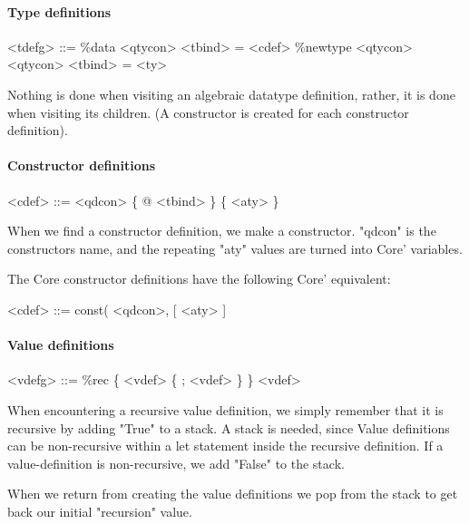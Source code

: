 \paragraph{Type definitions}

\begin{grammar}
<tdefg> ::= \%data <qtycon> <tbind> = <cdef>
       \alt \%newtype <qtycon> <qtycon> <tbind> = <ty>
\end{grammar}

Nothing is done when visiting an algebraic datatype definition, rather, it is done when 
visiting its children. (A constructor is created for each constructor definition).

\paragraph{Constructor definitions}

\begin{grammar}
<cdef> ::= <qdcon> \{ @ <tbind> \} \{ <aty> \}
\end{grammar}

When we find a constructor definition, we make a constructor. "qdcon" is the 
constructors name, and the repeating "aty" values are turned into Core' variables.

The Core constructor definitions have the following Core' equivalent:

\begin{grammar}
<cdef> ::= const( <qdcon>, [ <aty> ]
\end{grammar}

\paragraph{Value definitions}

\begin{grammar}
<vdefg> ::= \%rec \{ <vdef> \{ ; <vdef> \} \}
       \alt <vdef>
\end{grammar}

When encountering a recursive value definition, we simply remember that it is
recursive by adding "True" to a stack. A stack is needed, since Value definitions
can be non-recursive within a let statement inside the recursive definition. If
a value-definition is non-recursive, we add "False" to the stack.

When we return from creating the value definitions we pop from the stack to get
back our initial "recursion" value.

